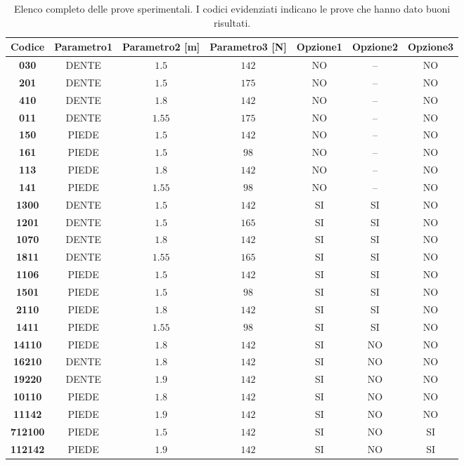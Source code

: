 \begin{sidewaystable}
%
\caption[Elenco completo delle prove sperimentali]{Elenco completo delle prove sperimentali. I {\color{webbrown} codici evidenziati} indicano le prove che hanno dato buoni risultati.}
%
\label{tab:sidewaystable}
%
\centering
%
\begin{tabular}{>{\bfseries}c c c c c c c}
%
\toprule
%
\textbf{Codice} & %
	\textbf{Parametro1}	& \textbf{Parametro2 [m]}	 & \textbf{Parametro3 [N]} %
							& \textbf{Opzione1} %
									& \textbf{Opzione2} %
											& \textbf{Opzione3}\\ 
%
\midrule
%
030  	& DENTE		& $1.5$		& $142$ 	& NO	& --	& NO\\ 
%
{\color{webbrown} 201}  	& DENTE		& $1.5$		& $175$ 	& NO	& --	& NO\\ 
%
410  	& DENTE		& $1.8$		& $142$ 	& NO	& --	& NO\\ 
%
{\color{webbrown} 011}  	& DENTE		& $1.55$		& $175$ 	& NO	& --	& NO\\ 
%
150  	& PIEDE		& $1.5$		& $142$ 	& NO	& --	& NO\\ 
%
{\color{webbrown} 161}  	& PIEDE		& $1.5$		& $98$ 	& NO	& --	& NO\\ 
%
113 	& PIEDE		& $1.8$		& $142$ 	& NO	& --	& NO\\ 
%
{\color{webbrown} 141}  	& PIEDE		& $1.55$		& $98$ 	& NO	& --	& NO\\ 
%
\midrule
%
{\color{webbrown} 1300}  	& DENTE		& $1.5$		& $142$ 		& SI 	& SI 	& NO\\
%
1201  	& DENTE		& $1.5$		& $165$ 		& SI 	& SI 	& NO\\
%
{\color{webbrown} 1070}  	& DENTE		& $1.8$		& $142$ 		& SI 	& SI 	& NO\\
%
1811  	& DENTE		& $1.55$		& $165$ 		& SI 	& SI 	& NO\\
%
{\color{webbrown} 1106}  	& PIEDE		& $1.5$		& $142$ 		& SI 	& SI 	& NO\\
%
1501  	& PIEDE		& $1.5$		& $98$ 		& SI 	& SI 	& NO\\
%
{\color{webbrown} 2110}  	& PIEDE		& $1.8$		& $142$ 		& SI 	& SI 	& NO\\
%
1411  	& PIEDE		& $1.55$		& $98$ 		& SI 	& SI 	& NO\\
%
\midrule
%
14110  	& PIEDE		& $1.8$		& $142$ 		& SI 	& NO 	& NO\\
%
16210  	& DENTE		& $1.8$		& $142$ 		& SI 	& NO 	& NO\\
%
19220  	& DENTE		& $1.9$		& $142$ 		& SI 	& NO 	& NO\\
%
10110  	& PIEDE		& $1.8$		& $142$ 		& SI 	& NO 	& NO\\
%
11142  	& PIEDE		& $1.9$		& $142$ 		& SI 	& NO 	& NO\\
%
\midrule
%
{\color{webbrown} 712100}  	& PIEDE		& $1.5$		& $142$ 		& SI 	& NO	& SI\\
%
112142  	& PIEDE		& $1.9$		& $142$ 		& SI 	& NO	& SI\\
%
\bottomrule 
%
\end{tabular}
%
\end{sidewaystable}
%
